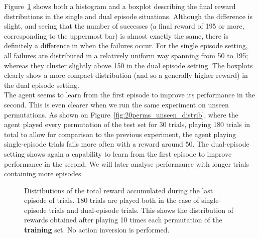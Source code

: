 Figure~\ref{fig:20perms_distrib} shows both a histogram and a boxplot describing
the final reward distributions in the single and dual episode situations. 
Although the difference is slight, and seeing that the number
of successes (a final reward of 195 or more, corresponding to the uppermost
bar) is almost exactly the same, there is definitely a difference in when the
failures occur. For the single episode setting, all failures are distributed
in a relatively uniform way spanning from 50 to 195; whereas they cluster 
slightly above 150 in the dual episode setting. The boxplots clearly show
a more compact distribution (and so a generally higher reward) in the dual
episode setting.\\

The agent seems to learn from the first episode to improve its performance in
the second. This is even clearer when we run the same experiment on unseen
permutations. As shown on Figure~\ref{fig:20perms_unseen_distrib}, where the
agent played every permutation of the test set for 30 trials, playing 180
trials in total to allow for comparison to the previous experiment, the agent
playing single-episode trials fails more often with a reward around 50. The
dual-episode setting shows again a capability to learn from the first episode
to improve performance in the second. We will later analyse performance
with longer trials containing more episodes.\\

\begin{figure}
	\centering
	\caption{Distributions of the total reward accumulated during the last
	episode of trials. 180 trials are played both in the case of
	single-episode trials and dual-episode trials. This shows the
	distribution of rewards obtained after playing 10 times each
	permutation of the \textbf{training} set. No action inversion is performed.}
	\label{fig:20perms_distrib}
\end{figure}

